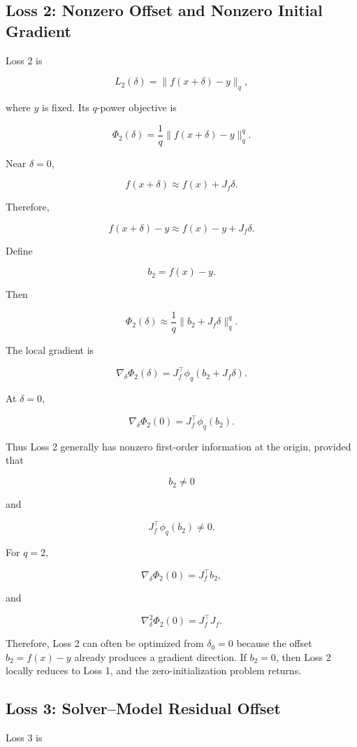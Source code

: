 \documentclass{article}
\begin{document}
\subsection{Loss 2: Nonzero Offset and Nonzero Initial Gradient}

Loss 2 is

\[
L_2(\delta)
=
\|f(x+\delta)-y\|_q,
\]

where \(y\) is fixed. Its \(q\)-power objective is

\[
\Phi_2(\delta)
=
\frac{1}{q}
\|f(x+\delta)-y\|_q^q.
\]

Near \(\delta=0\),

\[
f(x+\delta)
\approx
f(x)+J_f\delta.
\]

Therefore,

\[
f(x+\delta)-y
\approx
f(x)-y+J_f\delta.
\]

Define

\[
b_2=f(x)-y.
\]

Then

\[
\Phi_2(\delta)
\approx
\frac{1}{q}
\|b_2+J_f\delta\|_q^q.
\]

The local gradient is

\[
\nabla_\delta \Phi_2(\delta)
=
J_f^\top\phi_q(b_2+J_f\delta).
\]

At \(\delta=0\),

\[
\nabla_\delta \Phi_2(0)
=
J_f^\top\phi_q(b_2).
\]

Thus Loss 2 generally has nonzero first-order information at the origin, provided that

\[
b_2\neq0
\]

and

\[
J_f^\top\phi_q(b_2)\neq0.
\]

For \(q=2\),

\[
\nabla_\delta \Phi_2(0)
=
J_f^\top b_2,
\]

and

\[
\nabla_\delta^2\Phi_2(0)
=
J_f^\top J_f.
\]

Therefore, Loss 2 can often be optimized from \(\delta_0=0\) because the offset \(b_2=f(x)-y\) already produces a gradient direction. If \(b_2=0\), then Loss 2 locally reduces to Loss 1, and the zero-initialization problem returns.

\subsection{Loss 3: Solver--Model Residual Offset}

Loss 3 is
\end{document}
